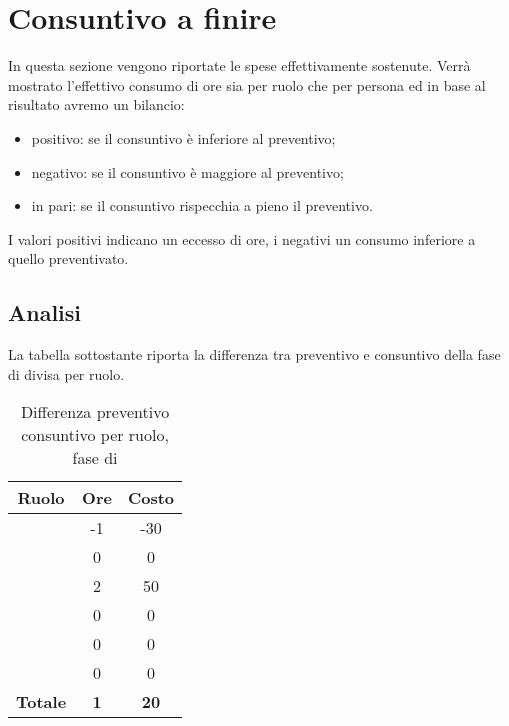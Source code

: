 \section{Consuntivo a finire}
In questa sezione vengono riportate le spese effettivamente sostenute. Verrà mostrato l'effettivo consumo di ore sia per ruolo che per persona ed in base al risultato avremo un bilancio:
\begin{itemize}
	\item positivo: se il consuntivo è inferiore al preventivo;
	\item negativo: se il consuntivo è maggiore al preventivo;
	\item in pari: se il consuntivo rispecchia a pieno il preventivo.
\end{itemize}
I valori positivi indicano un eccesso di ore, i negativi un consumo inferiore a quello preventivato.

\subsection{Analisi}
La tabella sottostante riporta la differenza tra preventivo e consuntivo della fase di \AR{} divisa per ruolo.
\begin{table}[H]
	\centering
	\begin{tabular}{|c|c|c|}
		\hline
		\textbf{Ruolo} &
		\textbf{Ore} &
		\textbf{Costo} \\
		\hline
		\Responsabile & -1 & -30\\
		\hline
		\Amministratore & 0 & 0\\
		\hline
		\Analista & 2 & 50\\
		\hline
		\Progettista & 0 & 0 \\
		\hline
		\Verificatore & 0 & 0\\
		\hline
		\Programmatore & 0 & 0 \\
		\hline
		\textbf{Totale} & \textbf{1} & \textbf{20} \\
		\hline
	\end{tabular}
	\caption{Differenza preventivo consuntivo per ruolo, fase di \AR}
\end{table}

